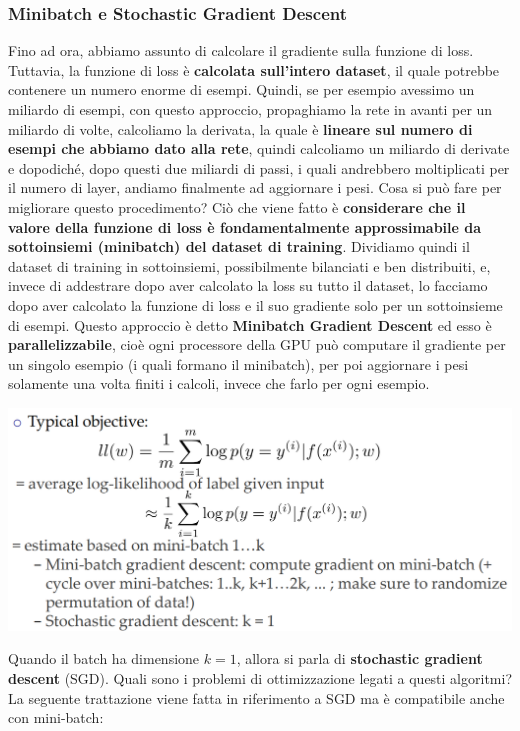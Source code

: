\documentclass[12pt]{article}
\begin{document}
\subsubsection{Minibatch e Stochastic Gradient Descent}
Fino ad ora, abbiamo assunto di calcolare il gradiente sulla funzione di loss.
Tuttavia, la funzione di loss è \textbf{calcolata sull'intero dataset}, il quale potrebbe contenere un numero enorme di esempi.
Quindi, se per esempio avessimo un miliardo di esempi, con questo approccio, propaghiamo la rete in avanti per un miliardo di volte, calcoliamo la derivata, la quale è \textbf{lineare sul numero di esempi che abbiamo dato alla rete}, quindi calcoliamo un miliardo di derivate e dopodiché, dopo questi due miliardi di passi, i quali andrebbero moltiplicati per il numero di layer, andiamo finalmente ad aggiornare i pesi.
Cosa si può fare per migliorare questo procedimento? Ciò che viene fatto è \textbf{considerare che il valore della funzione di loss è fondamentalmente approssimabile da sottoinsiemi (minibatch) del dataset di training}.
Dividiamo quindi il dataset di training in sottoinsiemi, possibilmente bilanciati e ben distribuiti, e, invece di addestrare dopo aver calcolato la loss su tutto il dataset, lo facciamo dopo aver calcolato la funzione di loss e il suo gradiente solo per un sottoinsieme di esempi.
Questo approccio è detto \textbf{Minibatch Gradient Descent} ed esso è \textbf{parallelizzabile}, cioè ogni processore della GPU può computare il gradiente per un singolo esempio (i quali formano il minibatch), per poi aggiornare i pesi solamente una volta finiti i calcoli, invece che farlo per ogni esempio.
\begin{center}
    \includegraphics[width =1\linewidth]{Images/164.PNG}
\end{center}
Quando il batch ha dimensione $k = 1$, allora si parla di \textbf{stochastic gradient descent} (SGD).
Quali sono i problemi di ottimizzazione legati a questi algoritmi? La seguente trattazione viene fatta in riferimento a SGD ma è compatibile anche con mini-batch:
\end{document}
